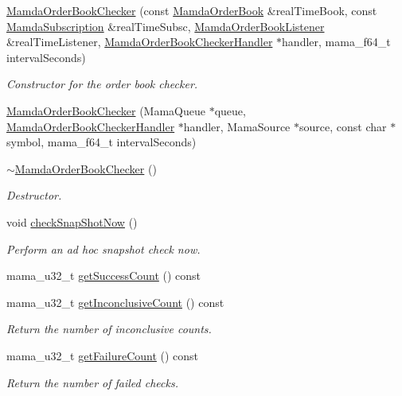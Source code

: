 \begin{CompactItemize}
\item 
\hyperlink{classWombat_1_1MamdaOrderBookChecker_f0427cac9cac0835084c247632702863}{Mamda\-Order\-Book\-Checker} (const \hyperlink{classWombat_1_1MamdaOrderBook}{Mamda\-Order\-Book} \&real\-Time\-Book, const \hyperlink{classWombat_1_1MamdaSubscription}{Mamda\-Subscription} \&real\-Time\-Subsc, \hyperlink{classWombat_1_1MamdaOrderBookListener}{Mamda\-Order\-Book\-Listener} \&real\-Time\-Listener, \hyperlink{classWombat_1_1MamdaOrderBookCheckerHandler}{Mamda\-Order\-Book\-Checker\-Handler} $\ast$handler, mama\_\-f64\_\-t interval\-Seconds)
\begin{CompactList}\small\item\em Constructor for the order book checker. \item\end{CompactList}\item 
\hyperlink{classWombat_1_1MamdaOrderBookChecker_6e5a49015e8d82944d395d1c242fe32e}{Mamda\-Order\-Book\-Checker} (Mama\-Queue $\ast$queue, \hyperlink{classWombat_1_1MamdaOrderBookCheckerHandler}{Mamda\-Order\-Book\-Checker\-Handler} $\ast$handler, Mama\-Source $\ast$source, const char $\ast$symbol, mama\_\-f64\_\-t interval\-Seconds)
\item 
\hyperlink{classWombat_1_1MamdaOrderBookChecker_cc281bbb5f7fa277c30adbb773bfa3b2}{$\sim$Mamda\-Order\-Book\-Checker} ()
\begin{CompactList}\small\item\em Destructor. \item\end{CompactList}\item 
void \hyperlink{classWombat_1_1MamdaOrderBookChecker_c16e5f139b6d15c90f5b22f74d63f1e6}{check\-Snap\-Shot\-Now} ()
\begin{CompactList}\small\item\em Perform an ad hoc snapshot check now. \item\end{CompactList}\item 
mama\_\-u32\_\-t \hyperlink{classWombat_1_1MamdaOrderBookChecker_bec33786f8ed6f0db835f4e4569bdfe6}{get\-Success\-Count} () const 
\item 
mama\_\-u32\_\-t \hyperlink{classWombat_1_1MamdaOrderBookChecker_5d7747faefdbf0dd53adc6b1dfae7567}{get\-Inconclusive\-Count} () const 
\begin{CompactList}\small\item\em Return the number of inconclusive counts. \item\end{CompactList}\item 
mama\_\-u32\_\-t \hyperlink{classWombat_1_1MamdaOrderBookChecker_66714db80a06cc1c1582e4bdfd1279ba}{get\-Failure\-Count} () const 
\begin{CompactList}\small\item\em Return the number of failed checks. \item\end{CompactList}\end{CompactItemize}


